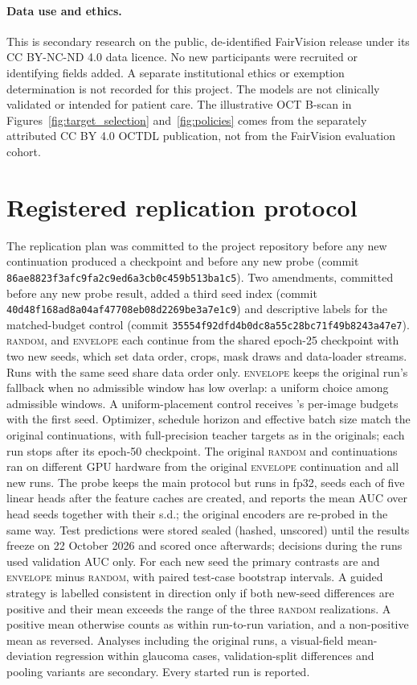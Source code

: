 \paragraph{Data use and ethics.}
\label{app:ethics}
This is secondary research on the public, de-identified FairVision release
under its CC BY-NC-ND 4.0 data licence. No new participants were recruited
or identifying fields added. A separate institutional ethics or exemption
determination is not recorded for this project. The models are not clinically
validated or intended for patient care. The illustrative OCT B-scan in
Figures~\ref{fig:target_selection} and~\ref{fig:policies} comes from the
separately attributed CC BY 4.0 OCTDL publication,
not from the FairVision evaluation cohort.

\section{Registered replication protocol}
\label{app:replication}
The replication plan was committed to the project repository before any new
continuation produced a checkpoint and before any new probe (commit
{\footnotesize\texttt{86ae8823f3afc9fa2c9ed6a3cb0c459b513ba1c5}}).
Two amendments, committed before any new probe result, added a third seed
index (commit {\footnotesize\texttt{40d48f168ad8a04af47708eb08d2269be3a7e1c9}})
and descriptive labels for the matched-budget control (commit
{\footnotesize\texttt{35554f92dfd4b0dc8a55c28bc71f49b8243a47e7}}).
\textsc{random}, \ArmBest{} and \textsc{envelope} each continue from the shared
epoch-25 checkpoint with two new seeds, which set data order, crops, mask draws
and data-loader streams. Runs with the same seed share data order only.
\textsc{envelope} keeps the original run's fallback when no admissible window
has low overlap: a uniform choice among admissible windows. A
uniform-placement control receives \ArmBest{}'s per-image budgets with the first
seed. Optimizer, schedule horizon and effective batch size match the original
continuations, with full-precision teacher targets as in the originals; each run
stops after its epoch-50 checkpoint. The original \textsc{random} and \ArmBest{}
continuations ran on different GPU hardware from the original \textsc{envelope}
continuation and all new runs.
The probe keeps the main protocol but runs in fp32, seeds each of five linear
heads after the feature caches are created, and reports the mean AUC over head
seeds together with their s.d.; the original encoders are re-probed in the same
way. Test predictions were stored sealed (hashed, unscored) until the results
freeze on 22 October 2026 and scored once afterwards; decisions during the runs
used validation AUC only. For each new seed the primary
contrasts are \ArmBest{} and \textsc{envelope} minus \textsc{random}, with paired
test-case bootstrap intervals. A guided strategy is labelled consistent in
direction only if both new-seed differences are positive and their mean exceeds
the range of the three \textsc{random} realizations. A positive mean otherwise
counts as within run-to-run variation, and a non-positive mean as reversed.
Analyses including the original runs, a visual-field mean-deviation regression
within glaucoma cases, validation-split differences and pooling
variants are secondary. Every started run is reported.

